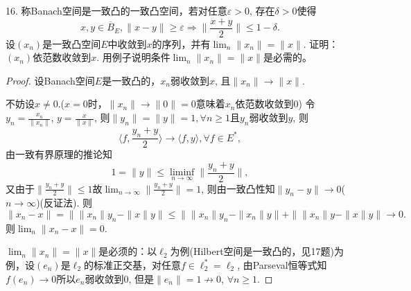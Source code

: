 \documentclass[a4paper,8pt]{ctexart}\textwidth 140mm \textheight 216mm
\newcommand{\e}{\varepsilon}
\newcommand{\8}{\infty}
\newcommand{\la}{\langle}
\newcommand{\ra}{\rangle}
\newcommand{\RA}{\Rightarrow}
\begin{document}
16. 称Banach空间是一致凸的一致凸空间，若对任意$\e>0$, 存在$\delta>0$使得
\[x,y\in\overline{B}_E, \|x-y\|\geq \e\RA \|\frac{x+y}{2}\|\leq 1-\delta.\]
设$(x_n)$是一致凸空间$E$中收敛到$x$的序列，并有$\lim_{n}\|x_n\|=\|x\|$. 证明：$(x_n)$依范数收敛到$x$. 用例子说明条件$\lim_{n}\|x_n\|=\|x\|$是必需的。
\begin{proof}
	设Banach空间$E$是一致凸的，$x_n$弱收敛到$x$, 且$\|x_n\|\to\|x\|$.
	
	不妨设$x\ne 0$.($x=0$时，$\|x_n\|\to\|0\|=0$意味着$x_n$依范数收敛到$0$)
	令$y_n=\frac{x_n}{\|x_n\|}$, $y=\frac{x}{\|x\|}$, 则$\|y_n\|=\|y\|=1,\forall n\geq 1$且$y_n$弱收敛到$y$, 则
	\[\la f,\frac{y_n+y}{2}\ra\to \la f, y \ra,\forall f\in E^*,\]
	由一致有界原理的推论知
	\[1=\|y\|\leq \liminf_{n\to\infty}\|\frac{y_n+y}{2}\|,\]
	又由于$\|\frac{y_n+y}{2}\|\leq 1$故$\lim_{n\to\infty}\|\frac{y_n+y}{2}\|=1$, 则由一致凸性知$\|y_n-y\|\to 0$($n\to\infty$)(反证法).
	则
	\[\|x_n-x\|=\|\|x_n\|y_n-\|x\|y\|\leq \|\|x_n\|y_n-\|x_n\|y\|+\|\|x_n\|y-\|x\|y\|\to0.\]
	则$\lim_{n}\|x_n-x\|=0$. 
	
	$\lim_{n}\|x_n\|=\|x\|$是必须的：以$\ell_2$为例(Hilbert空间是一致凸的，见17题)为例，设$(e_n)$是$\ell_2$的标准正交基，对任意$f\in \ell_2^*=\ell_2$, 由Parseval恒等式知$f(e_n)\to 0$所以$e_n$弱收敛到$0$, 但是$\|e_n\|=1\nrightarrow 0$, $\forall n\geq 1$.
\end{proof}
\end{document}
